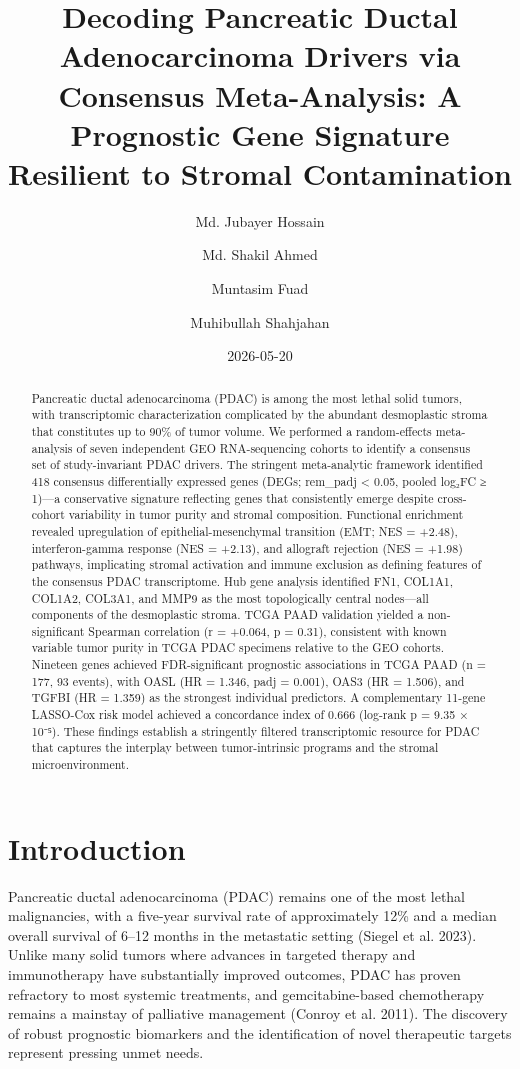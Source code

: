 \documentclass[
  12pt,
]{article}
\title{Decoding Pancreatic Ductal Adenocarcinoma Drivers via Consensus
Meta-Analysis: A Prognostic Gene Signature Resilient to Stromal
Contamination}
\author{Md. Jubayer Hossain \and Md. Shakil Ahmed \and Muntasim
Fuad \and Muhibullah Shahjahan}
\date{2026-05-20}
\begin{document}
\maketitle
\begin{abstract}
Pancreatic ductal adenocarcinoma (PDAC) is among the most lethal solid
tumors, with transcriptomic characterization complicated by the abundant
desmoplastic stroma that constitutes up to 90\% of tumor volume. We
performed a random-effects meta-analysis of seven independent GEO
RNA-sequencing cohorts to identify a consensus set of study-invariant
PDAC drivers. The stringent meta-analytic framework identified 418
consensus differentially expressed genes (DEGs; rem\_padj \textless{}
0.05, \textbar pooled log₂FC\textbar{} ≥ 1)---a conservative signature
reflecting genes that consistently emerge despite cross-cohort
variability in tumor purity and stromal composition. Functional
enrichment revealed upregulation of epithelial-mesenchymal transition
(EMT; NES = +2.48), interferon-gamma response (NES = +2.13), and
allograft rejection (NES = +1.98) pathways, implicating stromal
activation and immune exclusion as defining features of the consensus
PDAC transcriptome. Hub gene analysis identified FN1, COL1A1, COL1A2,
COL3A1, and MMP9 as the most topologically central nodes---all
components of the desmoplastic stroma. TCGA PAAD validation yielded a
non-significant Spearman correlation (r = +0.064, p = 0.31), consistent
with known variable tumor purity in TCGA PDAC specimens relative to the
GEO cohorts. Nineteen genes achieved FDR-significant prognostic
associations in TCGA PAAD (n = 177, 93 events), with OASL (HR = 1.346,
padj = 0.001), OAS3 (HR = 1.506), and TGFBI (HR = 1.359) as the
strongest individual predictors. A complementary 11-gene LASSO-Cox risk
model achieved a concordance index of 0.666 (log-rank p = 9.35 × 10⁻⁵).
These findings establish a stringently filtered transcriptomic resource
for PDAC that captures the interplay between tumor-intrinsic programs
and the stromal microenvironment.
\end{abstract}


\section{Introduction}\label{introduction}

Pancreatic ductal adenocarcinoma (PDAC) remains one of the most lethal
malignancies, with a five-year survival rate of approximately 12\% and a
median overall survival of 6--12 months in the metastatic setting
(Siegel et al. 2023). Unlike many solid tumors where advances in
targeted therapy and immunotherapy have substantially improved outcomes,
PDAC has proven refractory to most systemic treatments, and
gemcitabine-based chemotherapy remains a mainstay of palliative
management (Conroy et al. 2011). The discovery of robust prognostic
biomarkers and the identification of novel therapeutic targets represent
pressing unmet needs.
\end{document}
